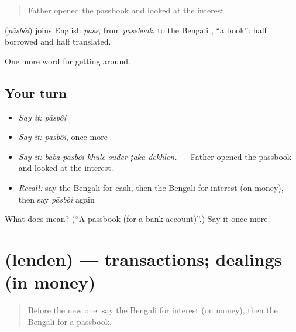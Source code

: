 \begin{quote}
Father opened the passbook and looked at the interest.
\end{quote}

\begin{cousinweb}
\textbf{} (\emph{pāsbôi}) joins English \emph{pass}, from \emph{passbook}, to the Bengali \textbf{}, \textquotedblleft{}a book\textquotedblright{}: half borrowed and half translated.
\end{cousinweb}

\begin{grammarlens}[title={What you've built}]
One more word for getting around.
\end{grammarlens}

\subsection*{Your turn}
\begin{itemize}
\raggedright
  \item \emph{Say it:} \emph{pāsbôi}
  \item \emph{Say it:} \emph{pāsbôi}, once more
  \item \emph{Say it:} \emph{bābā pāsbôi khule suder ṭākā dekhlen.} — Father opened the passbook and looked at the interest.
  \item \emph{Recall:} say the Bengali for cash, then the Bengali for interest (on money), then say \emph{pāsbôi} again
\end{itemize}

\begin{tcolorbox}[breakable,colback=teal!4,colframe=teal!35!black,title={Before you move on}]
What does  mean? (\textquotedblleft{}A passbook (for a bank account)\textquotedblright{}.) Say it once more.
\end{tcolorbox}
\section[\texorpdfstring{\bn{লেনদেন} (lenden)}{লেনদেন (lenden)}]{ (lenden) — transactions; dealings (in money)}

\label{lesson:BN-C415-lenden}



\begin{quote}
Before the new one: say the Bengali for interest (on money), then the Bengali for a passbook.
\end{quote}

